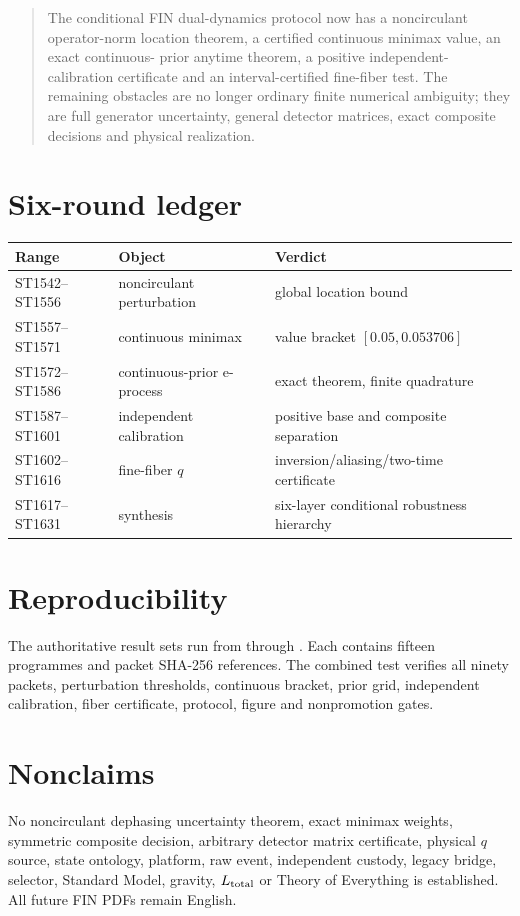 \documentclass[11pt,a4paper]{article}
\begin{document}
\begin{quote}
The conditional FIN dual-dynamics protocol now has a noncirculant operator-norm
location theorem, a certified continuous minimax value, an exact continuous-
prior anytime theorem, a positive independent-calibration certificate and an
interval-certified fine-fiber test.  The remaining obstacles are no longer
ordinary finite numerical ambiguity; they are full generator uncertainty,
general detector matrices, exact composite decisions and physical realization.
\end{quote}

\appendix
\section{Six-round ledger}
\begin{longtable}{@{}p{}p{}p{}@{}}
\toprule
Range & Object & Verdict \\
\midrule\endhead
ST1542--ST1556 & noncirculant perturbation & global location bound \\
ST1557--ST1571 & continuous minimax & value bracket $[0.05,0.053706]$ \\
ST1572--ST1586 & continuous-prior e-process & exact theorem, finite quadrature \\
ST1587--ST1601 & independent calibration & positive base and composite separation \\
ST1602--ST1616 & fine-fiber $q$ & inversion/aliasing/two-time certificate \\
ST1617--ST1631 & synthesis & six-layer conditional robustness hierarchy \\
\bottomrule
\end{longtable}

\section{Reproducibility}
The authoritative result sets run from
 through
.  Each contains fifteen programmes and
packet SHA-256 references.  The combined test
 verifies all ninety packets, perturbation
thresholds, continuous bracket, prior grid, independent calibration, fiber
certificate, protocol, figure and nonpromotion gates.

\section{Nonclaims}
No noncirculant dephasing uncertainty theorem, exact minimax weights, symmetric
composite decision, arbitrary detector matrix certificate, physical $q$ source,
state ontology, platform, raw event, independent custody, legacy bridge,
selector, Standard Model, gravity, $L_{\rm total}$ or Theory of Everything is
established.  All future FIN PDFs remain English.
\end{document}
